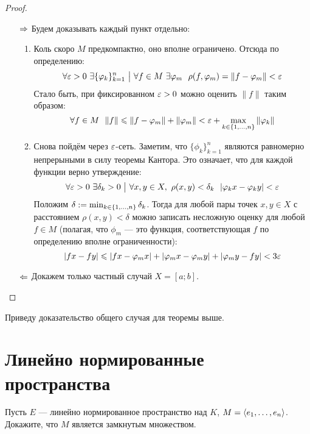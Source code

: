 \begin{proof}~
	\begin{itemize}
		\item[$\Rightarrow$] Будем доказывать каждый пункт отдельно:
		\begin{enumerate}
			\item Коль скоро $M$ предкомпактно, оно вполне ограничено. Отсюда по определению:
			\[
				\forall \varepsilon > 0\ \exists \{\varphi_k\}_{k = 1}^n \ \big|\  \forall f \in M\ \exists \varphi_m\ \ \rho(f, \varphi_m) = \|f - \varphi_m\| < \varepsilon
			\]
			Стало быть, при фиксированном $\varepsilon > 0$ можно оценить $\|f\|$ таким образом:
			\[
				\forall f \in M\ \ \|f\| \leqslant \|f - \varphi_m\| + \|\varphi_m\| < \varepsilon + \max_{k \in \{1, \ldots, n\}} \|\varphi_k\|
			\]
			
			\item Снова пойдём через $\varepsilon$-сеть. Заметим, что $\{\phi_k\}_{k = 1}^n$ являются равномерно непрерыными в силу теоремы Кантора. Это означает, что для каждой функции верно утверждение:
			\[
				\forall \varepsilon > 0\ \exists \delta_k > 0 \ \big|\  \forall x, y \in X,\ \rho(x, y) < \delta_k\ \ |\varphi_kx - \varphi_ky| < \varepsilon
			\]
			Положим $\delta := \min_{k \in \{1, \ldots, n\}} \delta_k$. Тогда для любой пары точек $x, y \in X$ с расстоянием $\rho(x, y) < \delta$ можно записать несложную оценку для любой $f \in M$ (полагая, что $\phi_m$ --- это функция, соответствующая $f$ по определению вполне ограниченности):
			\[
				|fx - fy| \leqslant |fx - \varphi_m x| + |\varphi_m x - \varphi_m y| + |\varphi_m y - fy| < 3\varepsilon
			\]
		\end{enumerate}
		
		\item[$\Leftarrow$] Докажем только частный случай $X = [a; b]$. 
	\end{itemize}
\end{proof}

\begin{anote}
	Приведу доказательство общего случая для теоремы выше.
\end{anote}

\section{Линейно нормированные пространства}

\begin{exercise}
	Пусть $E$ --- линейно нормированное пространство над $K$, $M = \left\langle e_1, \ldots, e_n\right\rangle$. Докажите, что $M$ является замкнутым множеством.
\end{exercise}